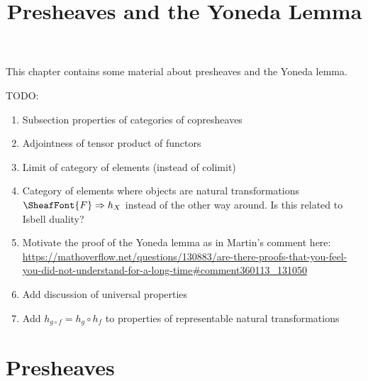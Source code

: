 

%



\title{Presheaves and the Yoneda Lemma}

\maketitle

\label{section-phantom}

This chapter contains some material about presheaves and the Yoneda lemma.

TODO:
\begin{enumerate}
    \item Subsection properties of categories of copresheaves
    \item Adjointness of tensor product of functors
    \item Limit of category of elements (instead of colimit)
    \item Category of elements where objects are natural transformations $\SheafFont{F}\Rightarrow h_{X}$ instead of the other way around. Is this related to Isbell duality?
    \item Motivate the proof of the Yoneda lemma as in Martin's comment here: \url{https://mathoverflow.net/questions/130883/are-there-proofs-that-you-feel-you-did-not-understand-for-a-long-time#comment360113_131050}
    \item Add discussion of universal properties
    \item Add $h_{g\circ f}=h_{g}\circ h_{f}$ to properties of representable natural transformations
\end{enumerate}

\ChapterTableOfContents

\section{Presheaves}\label{section-presheaves}
